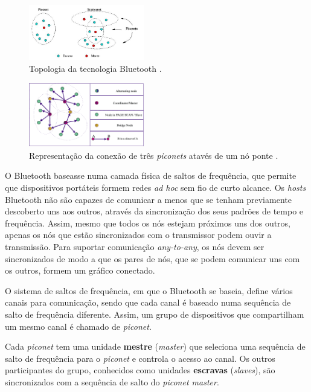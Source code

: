 \documentclass[conference]{IEEEtran}
\begin{document}
\begin{figure}[!t]
  \centering
  \includegraphics[width=0.45\textwidth]{Esquema_Bluetooth.png}
  \caption{Topologia da tecnologia Bluetooth \cite{blueesptec}.}
  \label{fig:topBluet}
\end{figure}

\begin{figure}[!t]
  \centering
  \includegraphics[width=0.45\textwidth]{no_ponte.png}
  \caption{Representação da conexão de três \textit{piconets} atavés de um nó ponte \cite{salonidis2005distributed}.}
  \label{fig:noPonte}
\end{figure}

O Bluetooth baseasse numa camada física de saltos de frequência, que permite que dispositivos portáteis formem redes \textit{ad hoc} sem fio de curto alcance. 
Os \textit{hosts} Bluetooth não são capazes de comunicar a menos que se tenham previamente descoberto uns aos outros, através da sincronização dos seus padrões de tempo e frequência. 
Assim, mesmo que todos os nós estejam próximos uns dos outros, apenas os nós que estão sincronizados com o transmissor podem ouvir a transmissão. 
Para suportar comunicação \textit{any-to-any}, os nós devem ser sincronizados de modo a que os pares de nós, que se podem comunicar uns com os outros, formem um gráfico conectado.

O sistema de saltos de frequência, em que o Bluetooth se baseia, define vários canais para comunicação, sendo que cada canal é baseado numa sequência de salto de frequência diferente. 
Assim, um grupo de dispositivos que compartilham um mesmo canal é chamado de \textit{piconet}. 

Cada \textit{piconet} tem uma unidade \textbf{mestre} (\textit{master}) que seleciona uma sequência de salto de frequência para o \textit{piconet} e controla o acesso ao canal. 
Os outros participantes do grupo, conhecidos como unidades \textbf{escravas} (\textit{slaves}), são sincronizados com a sequência de salto do \textit{piconet master}. 
\end{document}
